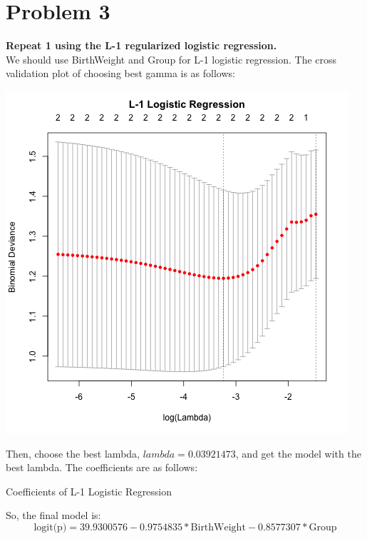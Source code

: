\documentclass[10pt,letterpaper]{article}
\begin{document}
\section*{Problem 3}
\textbf{Repeat 1 using the L-1 regularized logistic regression.}\\

We should use BirthWeight and Group for L-1 logistic regression. The cross validation plot of choosing best gamma is as follows:
\begin{center}
\includegraphics[scale=0.7]{cv_l1log}
\end{center}
Then, choose the best lambda, $lambda=0.03921473$, and get the model with the best lambda. The coefficients are as follows:
\begin{center}
Coefficients of L-1 Logistic Regression

\end{center}
So, the final model is:
\[\text{logit(p)} = 39.9300576-0.9754835*\text{BirthWeight}-0.8577307*\text{Group}\]
\end{document}
